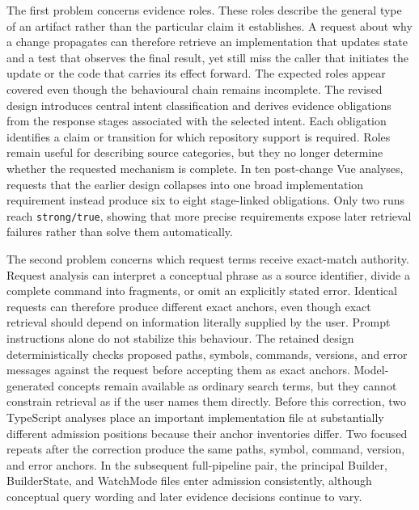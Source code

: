 The first problem concerns evidence roles. These roles describe the general type of an artifact rather than the particular claim it establishes. A request about why a change propagates can therefore retrieve an implementation that updates state and a test that observes the final result, yet still miss the caller that initiates the update or the code that carries its effect forward. The expected roles appear covered even though the behavioural chain remains incomplete. The revised design introduces central intent classification and derives evidence obligations from the response stages associated with the selected intent. Each obligation identifies a claim or transition for which repository support is required. Roles remain useful for describing source categories, but they no longer determine whether the requested mechanism is complete. In ten post-change Vue analyses, requests that the earlier design collapses into one broad implementation requirement instead produce six to eight stage-linked obligations. Only two runs reach \texttt{strong/true}, showing that more precise requirements expose later retrieval failures rather than solve them automatically.

The second problem concerns which request terms receive exact-match authority. Request analysis can interpret a conceptual phrase as a source identifier, divide a complete command into fragments, or omit an explicitly stated error. Identical requests can therefore produce different exact anchors, even though exact retrieval should depend on information literally supplied by the user. Prompt instructions alone do not stabilize this behaviour. The retained design deterministically checks proposed paths, symbols, commands, versions, and error messages against the request before accepting them as exact anchors. Model-generated concepts remain available as ordinary search terms, but they cannot constrain retrieval as if the user names them directly. Before this correction, two TypeScript analyses place an important implementation file at substantially different admission positions because their anchor inventories differ. Two focused repeats after the correction produce the same paths, symbol, command, version, and error anchors. In the subsequent full-pipeline pair, the principal Builder, BuilderState, and WatchMode files enter admission consistently, although conceptual query wording and later evidence decisions continue to vary.

